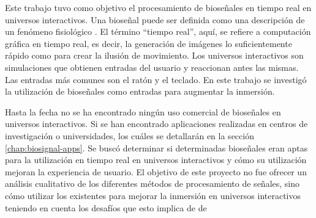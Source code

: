 Este trabajo tuvo como objetivo el procesamiento de bioseñales en tiempo real en universos interactivos. Una bioseñal puede ser definida como una descripción de un fenómeno fisiológico \cite{biosignal-book-2}.  El término ``tiempo real'', aquí, se refiere a computación gráfica en tiempo real, es decir, la generación de imágenes lo suficientemente rápido como para crear la ilusión de movimiento. Los universos interactivos son simulaciones que obtienen entradas del usuario y reaccionan antes las mismas. Las entradas más comunes son el ratón y el teclado. En este trabajo se investigó la utilización de bioseñales como entradas para augmentar la inmersión.

Hasta la fecha no se ha encontrado ningún uso comercial de bioseñales en universos interactivos. Si se han encontrado aplicaciones realizadas en centros de investigación o universidades, los cuáles se detallarán en la sección \ref{chap:biosignal-apps}. Se buscó determinar si determinadas bioseñales eran aptas para la utilización en tiempo real en universos interactivos y cómo su utilización mejoran la experiencia de usuario. El objetivo de este proyecto no fue ofrecer un análisis cualitativo de los diferentes métodos de procesamiento de señales, sino cómo utilizar los existentes para mejorar la inmersión en universos interactivos teniendo en cuenta los desafíos que esto implica de de 